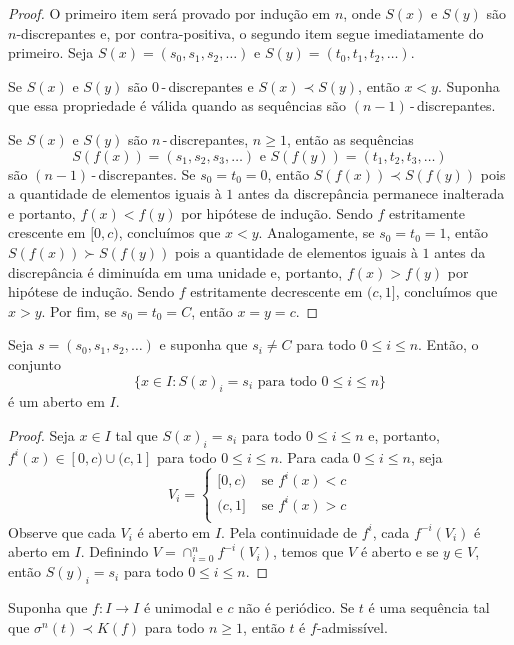 \begin{proof}
O primeiro item será provado por indução em $n$, onde $S(x)$ e $S(y)$ são $n$-discrepantes e, por contra-positiva, o segundo item segue imediatamente do primeiro. Seja $S(x) = (s_0, s_1, s_2, \dots)$ e $S(y) = (t_0, t_1, t_2, \dots)$.

Se $S(x)$ e $S(y)$ são $0$\,-\,discrepantes e $S(x) \prec S(y)$, então $x < y$. Suponha que essa propriedade é válida quando as sequências são $(n-1)$\,-\,discrepantes.

Se $S(x)$ e $S(y)$ são $n$\,-\,discrepantes, $n \geq 1$, então as sequências
$$S(f(x)) = (s_1, s_2, s_3, \dots) \textrm{ e } S(f(y)) = (t_1, t_2, t_3, \dots)$$
são $(n-1)$\,-\,discrepantes. Se $s_0 = t_0 = 0$, então $S(f(x)) \prec S(f(y))$ pois a quantidade de elementos iguais à $1$ antes da discrepância permanece inalterada e portanto, $f(x) < f(y)$ por hipótese de indução. Sendo $f$ estritamente crescente em $[0, c)$, concluímos que $x < y$. Analogamente, se $s_0 = t_0 = 1$, então $S(f(x)) \succ S(f(y))$ pois a quantidade de elementos iguais à $1$ antes da discrepância é diminuída em uma unidade e, portanto, $f(x) > f(y)$ por hipótese de indução. Sendo $f$ estritamente decrescente em $(c, 1]$, concluímos que $x > y$. Por fim, se $s_0 = t_0 = C$, então $x = y = c$.
\end{proof}

\begin{lemma}
Seja $s = (s_0, s_1, s_2, \dots)$ e suponha que $s_i \neq C$ para todo $0 \leq i \leq n$. Então, o conjunto
$$\{ x \in I : S(x)_i = s_i \textrm{ para todo } 0 \leq i \leq n \}$$
é um aberto em $I$.
\end{lemma}

\begin{proof}
Seja $x \in I$ tal que $S(x)_i = s_i$ para todo $0 \leq i \leq n$ e, portanto, $f^i(x) \in [0,c) \cup (c, 1]$ para todo $0 \leq i \leq n$. Para cada $0 \leq i \leq n$, seja
\[ V_i = 
\begin{cases} 
  [0, c) & \textrm{ se } f^i(x) < c \\
  (c, 1] & \textrm{ se } f^i(x) > c \\
\end{cases}
\]
Observe que cada $V_i$ é aberto em $I$. Pela continuidade de $f^i$, cada $f^{-i}(V_i)$ é aberto em $I$. Definindo $V = \cap_{i=0}^n f^{-i}(V_i)$, temos que $V$ é aberto e se $y \in V$, então $S(y)_i = s_i$ para todo $0 \leq i \leq n$.  
\end{proof}

\begin{theorem}
Suponha que $f: I \to I$ é unimodal e $c$ não é periódico. Se $t$ é uma sequência tal que $\sigma^n(t) \prec K(f)$ para todo $n \geq 1$, então $t$ é $f$-admissível.
\end{theorem}